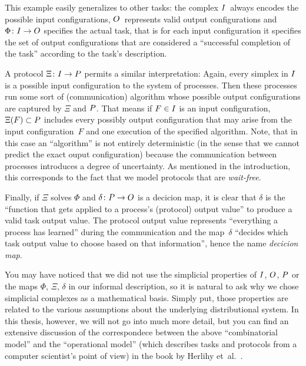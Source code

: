 This example easily generalizes to other tasks:
the complex $I$~always encodes the possible input configurations,
$O$~represents valid output configurations and $\Phi\colon I\to O$
specifies the actual task, that is for each input configuration it
specifies the set of output configurations that are considered a
\enquote{successful completion of the task} according to the task's
description.

A protocol $\Xi\colon I\to P$ permits a similar interpretation:
Again, every simplex in $I$ is a possible input configuration to
the system of processes. Then these processes run some sort of
(communication) algorithm whose possible output configurations are
captured by $\Xi$ and $P$. That means if $F\in I$ is an input
configuration, $\Xi(F) \subset P$ includes every possibly output
configuration that may arise from the input configuration~$F$ and
one execution of the specified algorithm. Note, that in this case
an \enquote{algorithm} is not entirely deterministic (in the sense
that we cannot predict the exact ouput configuration) because the
communication between processes introduces a degree of uncertainty.
As mentioned %
in the introduction, this corresponds to the fact that we model
protocols that are \emph{wait-free}.

Finally, if $\Xi$ solves $\Phi$ and $\delta\colon P\to O$ is a decicion
map, it is clear that $\delta$ is the \enquote{function that gets applied
to a process's (protocol) output value} to produce a valid task
output value. The protocol output value represents \enquote{everything
a process has learned} during the communication and the map~$\delta$
\enquote{decides which task output value to choose based on that
information}, hence the name \emph{decicion map}.

You may have noticed that we did not use the simplicial properties of
$I$, $O$, $P$ or the maps $\Phi$, $\Xi$, $\delta$ in our
informal description, so it is natural to ask why we chose simplicial
complexes as a mathematical basis. Simply put, those properties are
related to the various assumptions about the underlying distributional
system. In this thesis, however, we will not go into much more detail,
but you can find an extensive discussion of the correspondece between
the above \enquote{combinatorial model} and the \enquote{operational
model} (which describes tasks and protocols from a computer
scientist's point of view) in the book by
Herlihy et~al.~\cite[Ch.\,4]{bookc:herlihyetal13}.

